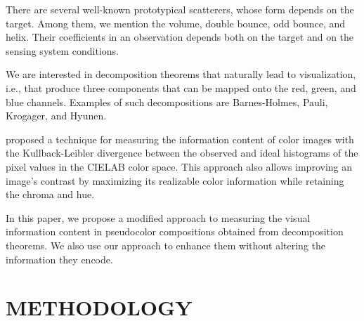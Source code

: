 \documentclass{article}
\begin{document}
There are several well-known prototypical scatterers, whose form depends on the target.
Among them, we mention the volume, double bounce, odd bounce, and helix.
Their coefficients in an observation depends both on the target and on the sensing system conditions.

We are interested in decomposition theorems that naturally lead to visualization, i.e., that produce three components that can be mapped onto the red, green, and blue channels.
Examples of such decompositions are Barnes-Holmes, Pauli, Krogager, and Hyunen.


\citet{AssessingInformationContentinColorImages} proposed a technique for measuring the information content of color images with the Kullback-Leibler divergence between the observed and ideal histograms of the pixel values in the CIELAB color space.
This approach also allows improving an image's contrast by maximizing its realizable color information while retaining the chroma and hue.

In this paper, we propose a modified approach to measuring the visual information content in pseudocolor compositions obtained from decomposition theorems.
We also use our approach to enhance them without altering the information they encode.

\section{METHODOLOGY}
\label{sec:meth}
\end{document}
